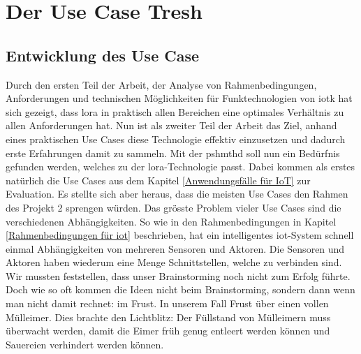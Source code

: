 \chapter{Der Use Case Tresh}
\section{Entwicklung des Use Case}\label{chapter:devOfUseCase}
Durch den ersten Teil der Arbeit, der Analyse von Rahmenbedingungen, Anforderungen und technischen Möglichkeiten für Funktechnologien von \gls{iotk} hat sich gezeigt, dass \gls{lora} in praktisch allen Bereichen eine optimales Verhältnis zu allen Anforderungen hat. Nun ist als zweiter Teil der Arbeit das Ziel, anhand eines praktischen Use Cases diese Technologie effektiv einzusetzen und dadurch erste Erfahrungen damit zu sammeln. Mit der \gls{pshmthd} soll nun ein Bedürfnis gefunden werden, welches zu der \gls{lora}-Technologie passt. Dabei kommen als erstes natürlich die Use Cases aus dem Kapitel \ref{Anwendungsfälle für IoT} zur Evaluation. Es stellte sich aber heraus, dass die meisten Use Cases den Rahmen des Projekt 2 sprengen würden. Das grösste Problem vieler Use Cases sind die verschiedenen Abhängigkeiten. So wie in den Rahmenbedingungen in Kapitel \ref{Rahmenbedingungen für iot} beschrieben, hat ein intelligentes \gls{iot}-System schnell einmal Abhängigkeiten von mehreren Sensoren und Aktoren. Die Sensoren und Aktoren haben wiederum eine Menge Schnittstellen, welche zu verbinden sind. Wir mussten feststellen, dass unser Brainstorming noch nicht zum Erfolg führte. Doch wie so oft kommen die Ideen nicht beim Brainstorming, sondern dann wenn man nicht damit rechnet: im Frust. In unserem Fall Frust über einen vollen Mülleimer. Dies brachte den Lichtblitz: Der Füllstand von Mülleimern muss überwacht werden, damit die Eimer früh genug entleert werden können und Sauereien verhindert werden können.

